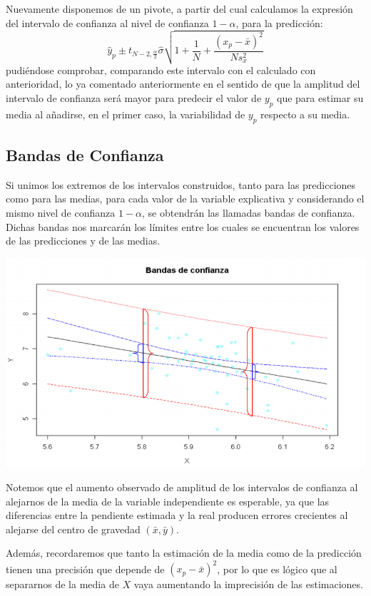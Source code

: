 \documentclass[10pt,a4paper]{book}
\begin{document}
Nuevamente disponemos de un pivote, a partir del cual calculamos la expresión del intervalo de confianza al nivel de confianza $1-\alpha$, para la predicción:
$$\widehat{y}_p\pm t_{N-2,\frac{\alpha}{2}}\widehat{\sigma}\sqrt{1+\dfrac{1}{N}+\dfrac{(x_p-\bar{x})^2}{Ns^2_x}}$$
pudiéndose comprobar, comparando este intervalo con el calculado con anterioridad, lo ya comentado anteriormente en el sentido de que la amplitud del intervalo de confianza será mayor para predecir el valor de $y_p$ que para estimar su media al añadirse, en el primer caso, la variabilidad de $y_p$ respecto a su media.
		\subsection{Bandas de Confianza}
Si unimos los extremos de los intervalos construidos, tanto para las predicciones como para las medias, para cada valor de la variable explicativa y considerando el mismo nivel de confianza $1-\alpha$, se obtendrán las llamadas bandas de confianza. Dichas bandas nos marcarán los límites entre los cuales se encuentran los valores de las predicciones y de las medias.

\begin{center}
\includegraphics[scale=.7]{imagenes/tema3_4-3.png} 
\end{center}

Notemos que el aumento observado de amplitud de los intervalos de confianza al alejarnos de la media de la variable independiente es esperable, ya que las diferencias entre la pendiente estimada y la real producen errores crecientes al alejarse del centro de gravedad $(\bar{x},\bar{y})$.

Además, recordaremos que tanto la estimación de la media como de la predicción tienen una precisión que depende de $(x_p-\bar{x})^2$, por lo que es lógico que al separarnos de la media de $X$ vaya aumentando la imprecisión de las estimaciones.
\end{document}

